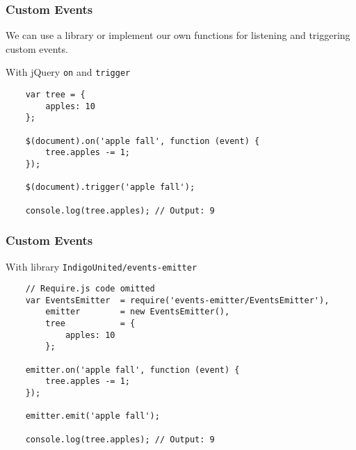 \begin{frame}[fragile]
  \frametitle{Custom Events}

  We can use a library or implement our own functions for listening and triggering custom events.

  \pause

  \begin{block}{With jQuery \texttt{on} and \texttt{trigger}}
    {\scriptsize
    \begin{verbatim}
    var tree = {
        apples: 10
    };

    $(document).on('apple fall', function (event) {
        tree.apples -= 1;
    });

    $(document).trigger('apple fall');

    console.log(tree.apples); // Output: 9
    \end{verbatim}
    }
  \end{block}
\end{frame}

\begin{frame}[fragile]
  \frametitle{Custom Events}
  \begin{block}{With library \texttt{IndigoUnited/events-emitter}}
    {\scriptsize
    \begin{verbatim}
    // Require.js code omitted
    var EventsEmitter  = require('events-emitter/EventsEmitter'),
        emitter        = new EventsEmitter(),
        tree           = {
            apples: 10
        };

    emitter.on('apple fall', function (event) {
        tree.apples -= 1;
    });

    emitter.emit('apple fall');

    console.log(tree.apples); // Output: 9
    \end{verbatim}
    }
  \end{block}
\end{frame}
